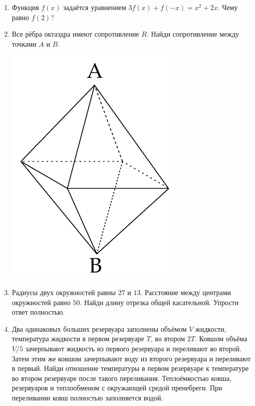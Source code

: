 \documentclass[12pt]{article} %
\begin{document}
\begin{enumerate}
\item Функция $f(x)$ задаётся уравнением $3f(x) + f(-x) = x^2 + 2x$. Чему равно $f(2)$?

\item
\begin{minipage}{\linewidth}
        \centering
        \begin{minipage}{0.58\linewidth}
        Все рёбра октаэдра имеют сопротивление $R$. Найди сопротивление между точками $A$ и $B$.
        \end{minipage}
        \hspace{0.05\linewidth}
        \begin{minipage}{0.15\linewidth}
            \includegraphics[scale=0.4]{resistors_octo.pdf}
        \end{minipage}
    \end{minipage} 

\item Радиусы двух окружностей равны $27$ и $13$. Расстояние между центрами окружностей равно $50$. 
Найди длину отрезка общей касательной. Упрости ответ полностью.

\item
Два одинаковых больших резервуара заполнены объёмом $V$ жидкости, температура жидкости в первом резервуаре $T$, 
во втором $2 T$. Ковшом объёма $V / 5$ зачерпывают жидкость из первого резервуара и переливают во второй. 
Затем этим же ковшом зачерпывают воду из второго резервуара и переливают в первый. 
Найди отношение температуры в первом резервуаре к температуре во втором резервуаре после такого переливания. 
Теплоёмкостью ковша, резервуаров и теплообменом с окружающей средой пренебреги. 
При переливании ковш полностью заполняется водой.


\end{enumerate}
\end{document}

